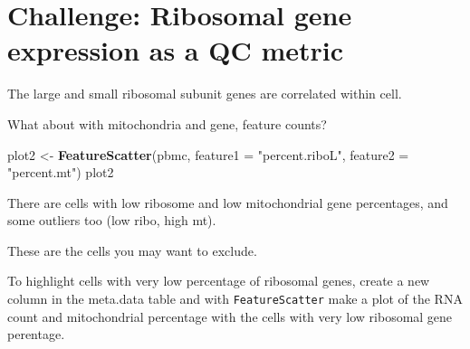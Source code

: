 \documentclass[
]{book}
\newenvironment{Shaded}{\begin{snugshade}}{\end{snugshade}}
\newcommand{\AttributeTok}[1]{\textcolor[rgb]{0.13,0.29,0.53}{#1}}
\newcommand{\DecValTok}[1]{\textcolor[rgb]{0.00,0.00,0.81}{#1}}
\newcommand{\FunctionTok}[1]{\textcolor[rgb]{0.13,0.29,0.53}{\textbf{#1}}}
\newcommand{\NormalTok}[1]{#1}
\newcommand{\OtherTok}[1]{\textcolor[rgb]{0.56,0.35,0.01}{#1}}
\newcommand{\SpecialCharTok}[1]{\textcolor[rgb]{0.81,0.36,0.00}{\textbf{#1}}}
\newcommand{\StringTok}[1]{\textcolor[rgb]{0.31,0.60,0.02}{#1}}
\begin{document}
\section{Challenge: Ribosomal gene expression as a QC metric}\label{challenge-ribosomal-gene-expression-as-a-qc-metric}

\begin{Shaded}
\end{Shaded}

The large and small ribosomal subunit genes are correlated within cell.

What about with mitochondria and gene, feature counts?

\begin{Shaded}
\begin{Highlighting}[]
\NormalTok{plot2 }\OtherTok{\textless{}{-}} \FunctionTok{FeatureScatter}\NormalTok{(pbmc, }\AttributeTok{feature1 =} \StringTok{"percent.riboL"}\NormalTok{, }\AttributeTok{feature2 =} \StringTok{"percent.mt"}\NormalTok{)}
\NormalTok{plot2}
\end{Highlighting}
\end{Shaded}

There are cells with low ribosome and low mitochondrial gene percentages, and some outliers too (low ribo, high mt).

These are the cells you may want to exclude.

To highlight cells with very low percentage of ribosomal genes, create a new column in the meta.data table and
with \texttt{FeatureScatter} make a plot of the RNA count and mitochondrial percentage with the cells with very low
ribosomal gene perentage.

\begin{Shaded}
\end{Shaded}
\end{document}
